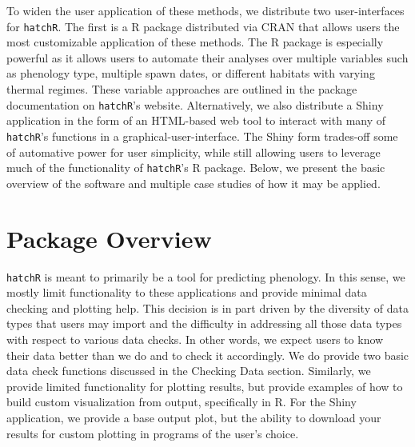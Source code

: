 \documentclass[10pt,a4paper,onecolumn]{article}
\begin{document}
To widen the user application of these methods, we distribute two
user-interfaces for \texttt{hatchR}. The first is a R package
distributed via CRAN that allows users the most customizable application
of these methods. The R package is especially powerful as it allows
users to automate their analyses over multiple variables such as
phenology type, multiple spawn dates, or different habitats with varying
thermal regimes. These variable approaches are outlined in the package
documentation on \texttt{hatchR}'s website. Alternatively, we also
distribute a Shiny application in the form of an HTML-based web tool to
interact with many of \texttt{hatchR}'s functions in a
graphical-user-interface. The Shiny form trades-off some of automative
power for user simplicity, while still allowing users to leverage much
of the functionality of \texttt{hatchR}'s R package. Below, we present
the basic overview of the software and multiple case studies of how it
may be applied.

\section{Package Overview}\label{package-overview}

\texttt{hatchR} is meant to primarily be a tool for predicting
phenology. In this sense, we mostly limit functionality to these
applications and provide minimal data checking and plotting help. This
decision is in part driven by the diversity of data types that users may
import and the difficulty in addressing all those data types with
respect to various data checks. In other words, we expect users to know
their data better than we do and to check it accordingly. We do provide
two basic data check functions discussed in the Checking Data section.
Similarly, we provide limited functionality for plotting results, but
provide examples of how to build custom visualization from output,
specifically in R. For the Shiny application, we provide a base output
plot, but the ability to download your results for custom plotting in
programs of the user's choice.
\end{document}

